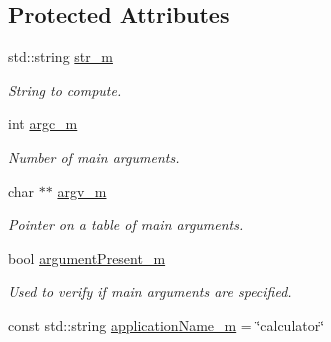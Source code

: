 \subsection*{Protected Attributes}
\begin{DoxyCompactItemize}
\item 
\hypertarget{class_application_a6b854bee68b76d31b8b2fb3e8d718e93}{}std\+::string \hyperlink{class_application_a6b854bee68b76d31b8b2fb3e8d718e93}{str\+\_\+m}\label{class_application_a6b854bee68b76d31b8b2fb3e8d718e93}

\begin{DoxyCompactList}\small\item\em String to compute. \end{DoxyCompactList}\item 
\hypertarget{class_application_ad1899c23670e3e62d65c79d2b5cab185}{}int \hyperlink{class_application_ad1899c23670e3e62d65c79d2b5cab185}{argc\+\_\+m}\label{class_application_ad1899c23670e3e62d65c79d2b5cab185}

\begin{DoxyCompactList}\small\item\em Number of main arguments. \end{DoxyCompactList}\item 
\hypertarget{class_application_aab5c326977c668262c049dadc87c09d3}{}char $\ast$$\ast$ \hyperlink{class_application_aab5c326977c668262c049dadc87c09d3}{argv\+\_\+m}\label{class_application_aab5c326977c668262c049dadc87c09d3}

\begin{DoxyCompactList}\small\item\em Pointer on a table of main arguments. \end{DoxyCompactList}\item 
\hypertarget{class_application_a09431f64a225af0307dc85797f5275bb}{}bool \hyperlink{class_application_a09431f64a225af0307dc85797f5275bb}{argument\+Present\+\_\+m}\label{class_application_a09431f64a225af0307dc85797f5275bb}

\begin{DoxyCompactList}\small\item\em Used to verify if main arguments are specified. \end{DoxyCompactList}\item 
\hypertarget{class_application_aac91ee20f03fe180e4a508772c19d93a}{}const std\+::string \hyperlink{class_application_aac91ee20f03fe180e4a508772c19d93a}{application\+Name\+\_\+m} = \char`\"{}calculator\char`\"{}\label{class_application_aac91ee20f03fe180e4a508772c19d93a}


\end{DoxyCompactItemize}
